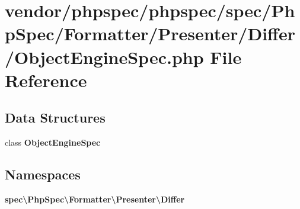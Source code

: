 \section{vendor/phpspec/phpspec/spec/\+Php\+Spec/\+Formatter/\+Presenter/\+Differ/\+Object\+Engine\+Spec.php File Reference}
\label{_object_engine_spec_8php}
\subsection*{Data Structures}
\begin{DoxyCompactItemize}
\item 
class {\bf Object\+Engine\+Spec}
\end{DoxyCompactItemize}
\subsection*{Namespaces}
\begin{DoxyCompactItemize}
\item 
 {\bf spec\textbackslash{}\+Php\+Spec\textbackslash{}\+Formatter\textbackslash{}\+Presenter\textbackslash{}\+Differ}
\end{DoxyCompactItemize}
